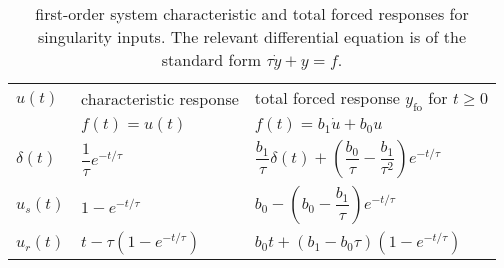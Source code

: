 \documentclass[dynamic_systems.tex]{subfiles}
\begin{document}
\begin{table}
\centering
\caption{first-order system characteristic and total forced responses for singularity inputs. The relevant differential equation is of the standard form $\tau \dot{y} + y = f$.}
\begin{tabular}{m{} m{} m{}}
	\toprule
	$u(t)$		& characteristic response		& total forced response $y_\text{fo}$ for $t \ge 0$ \\
	 & $f(t) = u(t)$ & $f(t) = b_1 \dot{u} + b_0 u$ \\ \midrule
	${\delta}(t)$	& $\dfrac{1}{\tau} e^{-t/\tau}$			& $\dfrac{b_1}{\tau} \delta(t) + \left (\dfrac{b_0}{\tau} - \dfrac{b_1}{\tau^2} \right ) e^{-t/\tau}$ \\
	$u_s(t)$		& $1 - e^{-t/\tau}$					& $b_0 - \left ( b_0 - \dfrac{b_1}{\tau} \right ) e^{-t/\tau}$ \\
	$u_r(t)$		& $t - \tau (1-e^{-t/\tau})$				& $b_0 t + (b_1 - b_0 \tau)(1-e^{-t/\tau})$ \\
	\bottomrule
\end{tabular}
\label{tab:forced_response_first_order}
\end{table}
\end{document}
